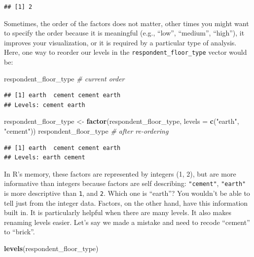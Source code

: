 \documentclass[]{book}
\newenvironment{Shaded}{\begin{snugshade}}{\end{snugshade}}
\newcommand{\KeywordTok}[1]{\textcolor[rgb]{0.13,0.29,0.53}{\textbf{#1}}}
\newcommand{\DataTypeTok}[1]{\textcolor[rgb]{0.13,0.29,0.53}{#1}}
\newcommand{\StringTok}[1]{\textcolor[rgb]{0.31,0.60,0.02}{#1}}
\newcommand{\CommentTok}[1]{\textcolor[rgb]{0.56,0.35,0.01}{\textit{#1}}}
\newcommand{\NormalTok}[1]{#1}
\begin{document}
\begin{verbatim}
## [1] 2
\end{verbatim}

Sometimes, the order of the factors does not matter, other times you
might want to specify the order because it is meaningful (e.g., ``low'',
``medium'', ``high''), it improves your visualization, or it is required
by a particular type of analysis. Here, one way to reorder our levels in
the \texttt{respondent\_floor\_type} vector would be:

\begin{Shaded}
\begin{Highlighting}[]
\NormalTok{respondent_floor_type }\CommentTok{# current order}
\end{Highlighting}
\end{Shaded}

\begin{verbatim}
## [1] earth  cement cement earth 
## Levels: cement earth
\end{verbatim}

\begin{Shaded}
\begin{Highlighting}[]
\NormalTok{respondent_floor_type <-}\StringTok{ }\KeywordTok{factor}\NormalTok{(respondent_floor_type, }\DataTypeTok{levels =} \KeywordTok{c}\NormalTok{(}\StringTok{"earth"}\NormalTok{, }\StringTok{"cement"}\NormalTok{))}
\NormalTok{respondent_floor_type }\CommentTok{# after re-ordering}
\end{Highlighting}
\end{Shaded}

\begin{verbatim}
## [1] earth  cement cement earth 
## Levels: earth cement
\end{verbatim}

In R's memory, these factors are represented by integers (1, 2), but are
more informative than integers because factors are self describing:
\texttt{"cement"}, \texttt{"earth"} is more descriptive than \texttt{1},
and \texttt{2}. Which one is ``earth''? You wouldn't be able to tell
just from the integer data. Factors, on the other hand, have this
information built in. It is particularly helpful when there are many
levels. It also makes renaming levels easier. Let's say we made a
mistake and need to recode ``cement'' to ``brick''.

\begin{Shaded}
\begin{Highlighting}[]
\KeywordTok{levels}\NormalTok{(respondent_floor_type)}
\end{Highlighting}
\end{Shaded}
\end{document}
